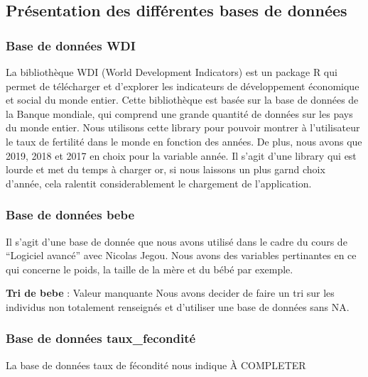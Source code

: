 \documentclass[
]{article}
\begin{document}
\hypertarget{pruxe9sentation-des-diffuxe9rentes-bases-de-donnuxe9es}{%
\subsection{Présentation des différentes bases de
données}\label{pruxe9sentation-des-diffuxe9rentes-bases-de-donnuxe9es}}

\hypertarget{base-de-donnuxe9es-wdi}{%
\subsubsection{Base de données WDI}\label{base-de-donnuxe9es-wdi}}

La bibliothèque WDI (World Development Indicators) est un package R qui
permet de télécharger et d'explorer les indicateurs de développement
économique et social du monde entier. Cette bibliothèque est basée sur
la base de données de la Banque mondiale, qui comprend une grande
quantité de données sur les pays du monde entier. Nous utilisons cette
library pour pouvoir montrer à l'utilisateur le taux de fertilité dans
le monde en fonction des années. De plus, nous avons que 2019, 2018 et
2017 en choix pour la variable année. Il s'agit d'une library qui est
lourde et met du temps à charger or, si nous laissons un plus garnd
choix d'année, cela ralentit considerablement le chargement de
l'application.

\hypertarget{base-de-donnuxe9es-bebe}{%
\subsubsection{Base de données bebe}\label{base-de-donnuxe9es-bebe}}

Il s'agit d'une base de donnée que nous avons utilisé dans le cadre du
cours de ``Logiciel avancé'' avec Nicolas Jegou. Nous avons des
variables pertinantes en ce qui concerne le poids, la taille de la mère
et du bébé par exemple.

\textbf{Tri de bebe} : Valeur manquante Nous avons decider de faire un
tri sur les individus non totalement renseignés et d'utiliser une base
de données sans NA.

\hypertarget{base-de-donnuxe9es-taux_fecondituxe9}{%
\subsubsection{Base de données
taux\_fecondité}\label{base-de-donnuxe9es-taux_fecondituxe9}}

La base de données taux de fécondité nous indique À COMPLETER
\end{document}
